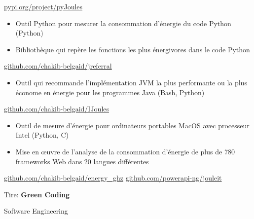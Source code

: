 \documentclass[10pt,a4paper,ragged2e,withhyper]{altacv}
\begin{document}
\begin{paracol}{2}
  \divider
   {\href{https://pypi.org/project/pyJoules}{pypi.org/project/pyJoules}}{}{}
  \begin{itemize}
    \item Outil Python pour mesurer la consommation d'énergie du code Python (Python)
  \end{itemize}
  \divider
  \begin{itemize}
    \item  Bibliothèque qui repère les fonctions les plus énergivores dans le code Python
  \end{itemize}
  \divider
   {\href{https://github.com/chakib-belgaid/jreferral}{github.com/chakib-belgaid/jreferral}}{}{}
  \begin{itemize}
    \item  Outil qui recommande l'implémentation JVM la plus performante ou la plus économe en énergie pour les programmes Java  (Bash, Python)
  \end{itemize}
  \divider
   {\href{https://github.com/chakib-belgaid/IJoules}{github.com/chakib-belgaid/IJoules}}{}{}
  \begin{itemize}
    \item  Outil de mesure d'énergie pour ordinateurs portables MacOS avec processeur Intel (Python, C)
  \end{itemize}
  \divider
  \begin{itemize}
    \item  Mise en œuvre de l'analyse de la consommation d'énergie de plus de 780 frameworks Web dans 20 langues différentes
  \end{itemize}
  \divider
   {\href{https://github.com/chakib-belgaid/energy_ghz}{github.com/chakib-belgaid/energy\_ghz}}{}{}
  \divider
   {\href{https://github.com/powerapi-ng/jouleit}{github.com/powerapi-ng/jouleit}}{}{}

  \medskip

  Tire: \textbf{Green Coding}

  \divider

  Software Engineering


\end{paracol}
\end{document}
